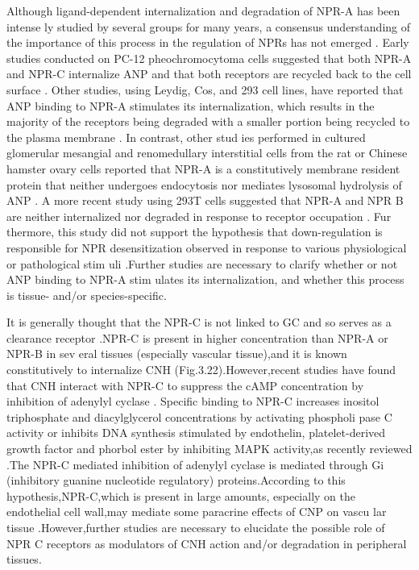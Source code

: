 \documentclass[14pt,a4paper,onecolumn]{extarticle}
\begin{document}
Although ligand-dependent internalization and degradation of NPR-A has been intense ly studied by several groups for many years, a consensus understanding of the importance of this process in the regulation of NPRs has not emerged \citep{182}. Early studies conducted on PC-12 pheochromocytoma cells suggested that both NPR-A and NPR-C internalize ANP and that both receptors are recycled back to the cell surface \citep{184}. Other studies, using Leydig, Cos, and 293 cell lines, have reported that ANP binding to NPR-A stimulates its internalization, which results in the majority of the receptors being degraded with a smaller portion being recycled to the plasma membrane \citep{184-187}. In contrast, other stud ies performed in cultured glomerular mesangial and renomedullary interstitial cells from the rat or Chinese hamster ovary cells reported that NPR-A is a constitutively membrane resident protein that neither undergoes endocytosis nor mediates lysosomal hydrolysis of ANP \citep{188}\citep{189}. A more recent study using 293T cells suggested that NPR-A and NPR B are neither internalized nor degraded in response to receptor occupation \citep{173}. Fur thermore, this study did not support the hypothesis that down-regulation is responsible for NPR desensitization observed in response to various physiological or pathological stim uli \citep{182}.Further studies are necessary to clarify whether or not ANP binding to NPR-A stim ulates its internalization, and whether this process is tissue- and/or species-specific.

It is generally thought that the NPR-C is not linked to GC and so serves as a clearance receptor \citep{28}\citep{77}\citep{78}.NPR-C is present in higher concentration than NPR-A or NPR-B in sev eral tissues (especially vascular tissue),and it is known constitutively to internalize CNH \citep{172} (Fig.3.22).However,recent studies have found that CNH interact with NPR-C to suppress the cAMP concentration by inhibition of adenylyl cyclase \citep{190}\citep{191}. Specific binding to NPR-C increases inositol triphosphate and diacylglycerol concentrations by activating phospholi pase C activity or inhibits DNA synthesis stimulated by endothelin, platelet-derived growth factor and phorbol ester by inhibiting MAPK activity,as recently reviewed \citep{190}.The NPR-C mediated inhibition of adenylyl cyclase is mediated through Gi (inhibitory guanine nucleotide regulatory) proteins.According to this hypothesis,NPR-C,which is present in large amounts, especially on the endothelial cell wall,may mediate some paracrine effects of CNP on vascu lar tissue \citep{168}\citep{190}.However,further studies are necessary to elucidate the possible role of NPR C receptors as modulators of CNH action and/or degradation in peripheral tissues.
\end{document}
